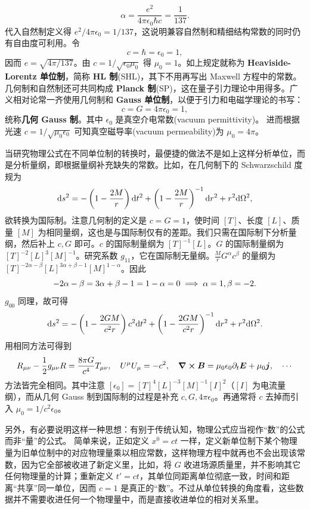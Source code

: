 \[
\alpha=\frac{e^2}{4\pi\epsilon_0\hbar c}=\frac{1}{137}.
\]
代入自然制定义得 $e^2/{4\pi\epsilon_0}=1/137$，这说明兼容自然制和精细结构常数的同时仍有自由度可利用。令
\[
c=\hbar=\epsilon_0=1,
\]
因而 $e=\sqrt{4\pi/137}$。由 $c=1/\sqrt{\epsilon_0\mu_0}$ 得 $\mu_0=1$。如上规定就称为 \textbf{Heaviside-Lorentz 单位制}，简称 \textbf{HL 制}(SHL)，其下不用再写出 Maxwell 方程中的常数。几何制和自然制还可共同构成 \textbf{Planck 制}(SP)，这在量子引力理论中用得多。广义相对论常一齐使用几何制和 \textbf{Gauss 单位制}，以便于引力和电磁学理论的书写：
\[
c=G=4\pi\epsilon_0=1,
\]
统称\textbf{几何 Gauss 制}。其中 $\epsilon_{0}$ 是真空介电常数(vacuum permittivity)。
进而根据光速 $c=1/\sqrt{\mu_0\epsilon_0}$ 可知真空磁导率(vacuum permeability)为 $\mu_{0}=4\pi$。 

当研究物理公式在不同单位制的转换时，最便捷的做法不是如上这样分析单位，而是分析量纲，即根据量纲补充缺失的常数。比如，在几何制下的 Schwarzschild 度规为
\[
    \dd s^2=-\left(1-\frac{2M}{r}\right)\dd t^2+\left(1-\frac{2M}{r}\right)^{-1}\dd r^2+r^2\dd\Omega^2,
\]
欲转换为国际制。注意几何制的定义是 $c=G=1$，使时间 $[T]$、长度 $[L]$、质量 $[M]$ 为相同量纲，这也是与国际制仅有的差距。我们只需在国际制下分析量纲，然后补上 $c,G$ 即可。$c$ 的国际制量纲为 $[T]^{-1}[L]$。$G$ 的国际制量纲为 $[T]^{-2}[L]^3[M]^{-1}$。研究系数 $g_{11}$，它在国际制无量纲。$\frac{M}{r}G^{\alpha}c^{\beta}$ 的量纲为 $[T]^{-2\alpha-\beta}[L]^{3\alpha+\beta-1}[M]^{1-\alpha}$。因此
\[
    -2\alpha-\beta=3\alpha+\beta-1=1-\alpha=0\implies \alpha=1,\beta=-2.
\]
$g_{00}$ 同理，故可得
\[
    \dd s^2=-\left(1-\frac{2GM}{c^2 r}\right)c^2\dd t^2+\left(1-\frac{2GM}{c^2 r}\right)^{-1}\dd r^2+r^2\dd\Omega^2.
\]
用相同方法可得到
\[
    R_{\mu\nu}-\frac 12 g_{\mu\nu} R=\frac{8\pi G}{c^4} T_{\mu\nu},\quad U^\mu U_\mu = - c^2,\quad \curl\bm B=\mu_0\epsilon_0\partial_t\bm E+\mu_0\bm j, \quad \cdots
\]
方法皆完全相同。其中注意 $[\epsilon_0]=[T]^4[L]^{-3}[M]^{-1}[I]^2$（$[I]$ 为电流量纲），而从几何 Gauss 制到国际制的过程是补充 $c,G,4\pi\epsilon_0$。再通常将 $c$ 去掉而引入 $\mu_0=1/c^2\epsilon_0$。

另外，有必要说明这样一种思想：有别于传统认知，物理公式应当视作“数”的公式而非“量”的公式。
简单来说，正如定义 $x^0=ct$ 一样，定义新单位制下某个物理量为旧单位制中的对应物理量乘以相应常数，这样物理方程中就再也不会出现该常数，因为它全部被收进了新定义里，比如，将 $G$ 收进场源质量里，并不影响其它任何物理量的计算；重新定义 $t'=ct$，其单位同距离单位彻底一致，时间和距离“共享”同一单位，因而 $c=1$ 是真正的“数”。不过从单位转换的角度看，这些数据并不需要收进任何一个物理量中，而是直接收进单位的相对关系里。
\label{notation}